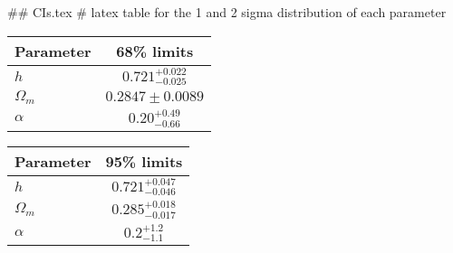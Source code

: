## CIs.tex
# latex table for the 1 and 2 sigma distribution of each parameter

\begin{tabular} { l  c}
 Parameter &  68\% limits\\
\hline
{\boldmath$h              $} & $0.721^{+0.022}_{-0.025}   $\\
{\boldmath$\Omega_m       $} & $0.2847\pm 0.0089          $\\
{\boldmath$\alpha         $} & $0.20^{+0.49}_{-0.66}      $\\
\hline
\end{tabular}

\begin{tabular} { l  c}
 Parameter &  95\% limits\\
\hline
{\boldmath$h              $} & $0.721^{+0.047}_{-0.046}   $\\
{\boldmath$\Omega_m       $} & $0.285^{+0.018}_{-0.017}   $\\
{\boldmath$\alpha         $} & $0.2^{+1.2}_{-1.1}         $\\
\hline
\end{tabular}
